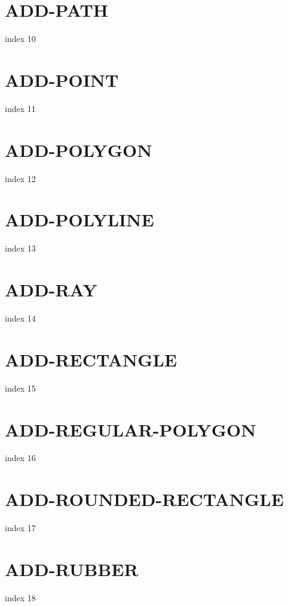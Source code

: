 \documentclass[10pt]{report}
\begin{document}
\section{ADD-PATH}

index 10

\section{ADD-POINT}

index 11

\section{ADD-POLYGON}

index 12

\section{ADD-POLYLINE}

index 13

\section{ADD-RAY}

index 14

\section{ADD-RECTANGLE}

index 15

\section{ADD-REGULAR-POLYGON}

index 16

\section{ADD-ROUNDED-RECTANGLE}

index 17

\section{ADD-RUBBER}

index 18
\end{document}
